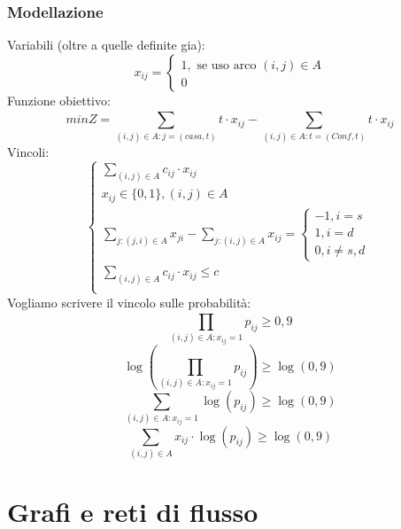 \documentclass[12pt,a4paper]{article}
\let\oldsection\section
\renewcommand{\section}{\clearpage\oldsection}
\begin{document}
\subsubsection{Modellazione}
Variabili (oltre a quelle definite gia):
\[
x_{ij} = \begin{cases}
    1, \text{ se uso arco } (i,j) \in A\\
    0
\end{cases}
\]
Funzione obiettivo:
\[
minZ = \sum_{(i,j) \in A : j = (casa, t)}^{} t \cdot x_{ij} - \sum_{(i,j) \in A : t = (Conf,t)}^{} t \cdot x_{ij}
\]
Vincoli:
\[
\begin{cases}
    \sum_{(i,j) \in A}^{} c_{ij} \cdot x_{ij}\\
    x_{ij} \in \{0,1\}, (i,j) \in A\\
    \sum_{j:(j,i) \in A}^{} x_{ji} - \sum_{j:(i,j) \in A}^{} x_{ij} = \begin{cases}
        -1, i = s\\
        1, i = d\\
        0, i \ne s,d
    \end{cases}\\
    \sum_{(i,j) \in A}^{} c_{ij} \cdot x_{ij} \leq c\\
\end{cases}
\]
Vogliamo scrivere il vincolo sulle probabilità:
\[
\prod_{(i,j) \in A: x_{ij} = 1}^{} p_{ij} \geq 0,9
\]
\[
\log(\prod_{(i,j) \in A: x_{ij} = 1}^{} p_{ij}) \geq \log(0,9)
\]
\[
\sum_{(i,j) \in A: x_{ij} = 1}^{} \log(p_{ij}) \geq \log(0,9)
\]
\[
\sum_{(i,j) \in A}^{} x_{ij} \cdot \log(p_{ij}) \geq \log(0,9)
\]

\section{Grafi e reti di flusso}
\end{document}

